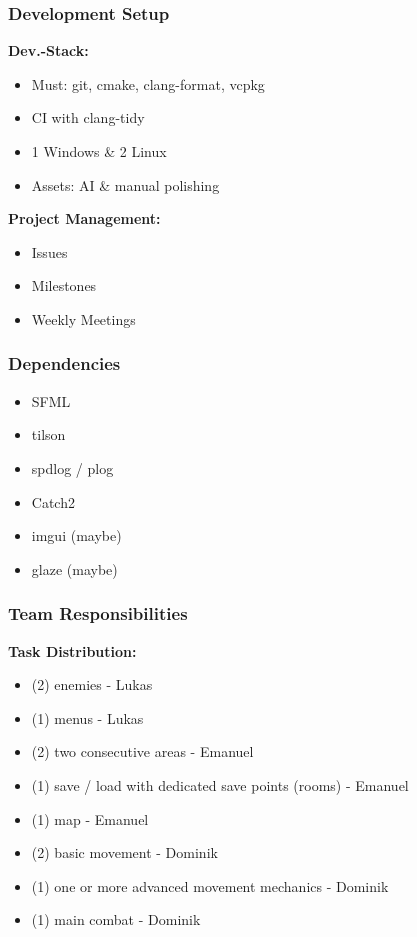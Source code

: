 \documentclass[11pt,t,usepdftitle=false,aspectratio=169]{beamer}
\begin{document}
\begin{frame}
	\frametitle{Development Setup}

	\textbf{Dev.-Stack:}
	\begin{itemize}
		\item Must: git, cmake, clang-format, vcpkg
		\item CI with clang-tidy
		\item 1 Windows \& 2 Linux
		\item Assets: AI \& manual polishing
	\end{itemize}


	\textbf{Project Management:}
	\begin{itemize}
		\item Issues
		\item Milestones
		\item Weekly Meetings
	\end{itemize}

\end{frame}

\begin{frame}
	\frametitle{Dependencies}

	\begin{itemize}
		\item SFML
		\item tilson
		\item spdlog / plog
		\item Catch2
		\item imgui (maybe)
		\item glaze (maybe)
	\end{itemize}

\end{frame}

\begin{frame}
	\frametitle{Team Responsibilities}

	\textbf{Task Distribution:}
	\begin{itemize}
		\item (2) enemies - Lukas
		\item (1) menus - Lukas
		\item (2) two consecutive areas - Emanuel
		\item (1) save / load with dedicated save points (rooms) - Emanuel
		\item (1) map - Emanuel
		\item (2) basic movement - Dominik
		\item (1) one or more advanced movement mechanics - Dominik
		\item (1) main combat - Dominik
	\end{itemize}

\end{frame}
\end{document}
